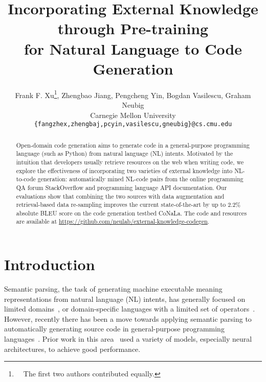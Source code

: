\documentclass[11pt,a4paper]{article}
\title{Incorporating External Knowledge through Pre-training \\ for Natural Language to Code Generation}
\author{
Frank F. Xu\thanks{~~The first two authors contributed equally.}, Zhengbao Jiang\footnotemark[1], Pengcheng Yin, Bogdan Vasilescu, Graham Neubig \\
Carnegie Mellon University \\
\texttt{\{fangzhex,zhengbaj,pcyin,vasilescu,gneubig\}@cs.cmu.edu}
}
\date{}
\begin{document}
\maketitle
\begin{abstract}
Open-domain code generation aims to generate code in a general-purpose programming language (such as Python) from natural language (NL) intents.
Motivated by the intuition that developers usually retrieve resources on the web when writing code, 
we explore the effectiveness of incorporating two varieties of external knowledge into NL-to-code generation: automatically mined NL-code pairs from the online programming QA forum StackOverflow and programming language API documentation.
Our evaluations show that combining the two sources with data augmentation and retrieval-based data re-sampling improves the current state-of-the-art by up to 2.2\% absolute BLEU score on the code generation testbed CoNaLa.
The code and resources are available at \url{https://github.com/neulab/external-knowledge-codegen}.
\end{abstract}

\section{Introduction}









Semantic parsing, the task of generating machine executable meaning 
representations from natural language (NL) intents, has generally focused 
on limited domains~\cite{zelle1996learning,data-atis-original}, or 
domain-specific languages with a limited set of operators~\cite{berant-etal-2013-semantic,quirk-etal-2015-language,dong-lapata-2016-language,liang-etal-2017-neural,krishnamurthy-etal-2017-neural,zhong2017seq2sql,yu-etal-2018-spider,yu-etal-2019-sparc,yu-etal-2019-cosql}. 
However, recently there has been a move towards applying semantic 
parsing to automatically generating source code in general-purpose programming languages~\cite{yin2018mining,yao2018staqc,lin-etal-2018-nl2bash,agashe-etal-2019-juice,yao2019coacor}. 
Prior work in this area~\cite{xiao-etal-2016-sequence,ling-etal-2016-latent,rabinovich-etal-2017-abstract,yin-neubig-2017-syntactic,yin-neubig-2018-tranx,dong-lapata-2018-coarse,
suhr-etal-2018-learning,iyer-etal-2018-mapping,yin-neubig-2019-reranking} used a variety of models,
especially neural architectures, to achieve good performance.
\end{document}
